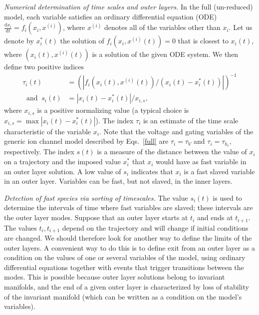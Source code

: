 \documentclass{llncs}
\newcommand{\vect}[1]{\ensuremath{  #1 } }
\newcommand{\D}[2]{ \ensuremath{ \frac{\mathrm{d} #1 }{\mathrm{d} #2 } }}
\begin{document}
\textit{Numerical determination of time scales and outer layers.} In the full (un-reduced) model,
each variable satisfies an ordinary differential equation (ODE) $\D{x_i}{t} = f_i(x_i,\vect{x}^{(i)})$, where  $\vect{x}^{(i)}$
denotes all of the variables other than $x_i$.
Let us denote by $x_i^*(t)$ the solution of $f_i(x_i,\vect{x}^{(i)}(t)) = 0$ that is closest to $x_i(t)$,
where $(x_i(t),\vect{x}^{(i)}(t))$ is a solution of the given ODE system.
We then define two positive indices
\begin{equation}
\begin{aligned}
\tau_i(t) &=  (|f_i(x_i(t),\vect{x}^{(i)}(t))/(x_i(t)-x_i^*(t))|)^{-1}\\
~\text{~and~}~
s_i(t) &= | x_i(t) - x_i^*(t) |/x_{i,s}, \label{indices}
\end{aligned}
\end{equation}
where $x_{i,s}$ is a positive normalizing value (a typical choice is $x_{i,s} = \max | x_i(t) - x_i^*(t) |$).
The index $\tau_i$ is an estimate of the time scale characteristic of the
variable $x_i$. Note that the voltage and gating variables of the
generic ion channel model described by Eqs.~\eqref{full} are $\tau_i =\tau_V$ and
$\tau_i = \tau_{h_i}$, respectively.  The index $s(t)$ is a measure of the
distance between the value of $x_i$ on a trajectory and the imposed value
$x_i^*$ that $x_i$ would have as fast variable in an outer layer solution.
A low value of $s_i$ indicates that $x_i$ is a fast slaved variable in an outer
layer. Variables can be fast, but not slaved, in the inner layers.

\textit{Detection of fast species via sorting of timescales.}
The value $s_i(t)$ is used to determine the intervals of time where fast
variables are slaved; these intervals are the outer layer modes. Suppose that an
outer layer starts at $t_i$ and ends at $t_{i+1}$.  The values $t_i, t_{i+1}$
depend on the trajectory and will change if initial conditions are changed.  We
should therefore look for another way  to define the limits of the outer
layers. A convenient way to do this is to define exit from an outer layer as a condition
on the values of one or several variables of the model, using ordinary
differential equations together with events that trigger transitions between the modes. This is possible
because outer layer solutions belong to invariant manifolds, and the end of a given
outer layer is characterized by loss of stability of the invariant manifold (which
can be written as a condition on the model's variables).
\end{document}
